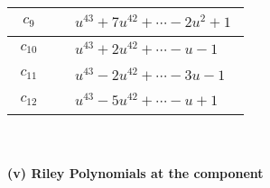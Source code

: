 \documentclass[1p]{elsarticle_modified}
\theoremstyle{definition}
\begin{document}
\begin{tabular}{m{50pt}|m{274pt}}
\hline $$\begin{aligned}c_{9}\end{aligned}$$&$\begin{aligned}
&u^{43}+7 u^{42}+\cdots-2 u^2+1
\end{aligned}$\\
\hline $$\begin{aligned}c_{10}\end{aligned}$$&$\begin{aligned}
&u^{43}+2 u^{42}+\cdots- u-1
\end{aligned}$\\
\hline $$\begin{aligned}c_{11}\end{aligned}$$&$\begin{aligned}
&u^{43}-2 u^{42}+\cdots-3 u-1
\end{aligned}$\\
\hline $$\begin{aligned}c_{12}\end{aligned}$$&$\begin{aligned}
&u^{43}-5 u^{42}+\cdots- u+1
\end{aligned}$\\
\hline
\end{tabular}\\~\\
\newpage\renewcommand{\arraystretch}{1}
\flushleft \textbf{(v) Riley Polynomials at the component}\newline \\
\end{document}
